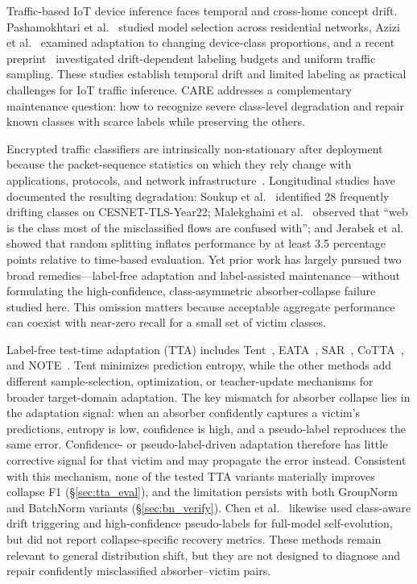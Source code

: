 \documentclass[journal]{IEEEtran}
\begin{document}
Traffic-based IoT device inference faces temporal and cross-home concept drift. Pashamokhtari et al.~\cite{pashamokhtari2023dynamic} studied model selection across residential networks, Azizi et al.~\cite{azizi2025labelshift} examined adaptation to changing device-class proportions, and a recent preprint~\cite{azizi2026budget} investigated drift-dependent labeling budgets and uniform traffic sampling. These studies establish temporal drift and limited labeling as practical challenges for IoT traffic inference. CARE addresses a complementary maintenance question: how to recognize severe class-level degradation and repair known classes with scarce labels while preserving the others.

Encrypted traffic classifiers are intrinsically non-stationary after deployment because the packet-sequence statistics on which they rely change with applications, protocols, and network infrastructure~\cite{rezaei2019deep,soukup2025drift,malekghaini2023drift}. Longitudinal studies have documented the resulting degradation: Soukup et al.~\cite{soukup2025drift} identified 28 frequently drifting classes on CESNET-TLS-Year22; Malekghaini et al.~\cite{malekghaini2023drift} observed that ``web is the class most of the misclassified flows are confused with''; and Jerabek et al.~\cite{jerabek2025eval} showed that random splitting inflates performance by at least 3.5 percentage points relative to time-based evaluation. Yet prior work has largely pursued two broad remedies---label-free adaptation and label-assisted maintenance---without formulating the high-confidence, class-asymmetric absorber-collapse failure studied here. This omission matters because acceptable aggregate performance can coexist with near-zero recall for a small set of victim classes.

Label-free test-time adaptation (TTA) includes Tent~\cite{wang2021tent}, EATA~\cite{niu2022eata}, SAR~\cite{niu2023sar}, CoTTA~\cite{wang2022cotta}, and NOTE~\cite{gong2022note}. Tent minimizes prediction entropy, while the other methods add different sample-selection, optimization, or teacher-update mechanisms for broader target-domain adaptation. The key mismatch for absorber collapse lies in the adaptation signal: when an absorber confidently captures a victim's predictions, entropy is low, confidence is high, and a pseudo-label reproduces the same error. Confidence- or pseudo-label-driven adaptation therefore has little corrective signal for that victim and may propagate the error instead. Consistent with this mechanism, none of the tested TTA variants materially improves collapse F1 (\S\ref{sec:tta_eval}), and the limitation persists with both GroupNorm and BatchNorm variants (\S\ref{sec:bn_verify}). Chen et al.~\cite{chen2025selfevolving} likewise used class-aware drift triggering and high-confidence pseudo-labels for full-model self-evolution, but did not report collapse-specific recovery metrics. These methods remain relevant to general distribution shift, but they are not designed to diagnose and repair confidently misclassified absorber--victim pairs.
\end{document}
